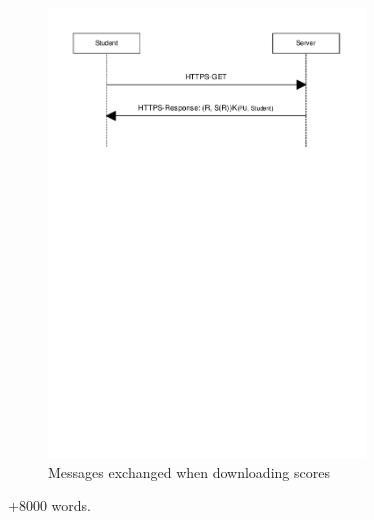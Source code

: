 \documentclass{article}
\begin{document}
\begin{figure}
\begin{center}
\includegraphics[width=0.75\textwidth]{images/download_scores.pdf}
\caption{Messages exchanged when downloading scores}
\label{fig:download-scores}
\end{center}
\end{figure}

+8000 words.
\end{document}
